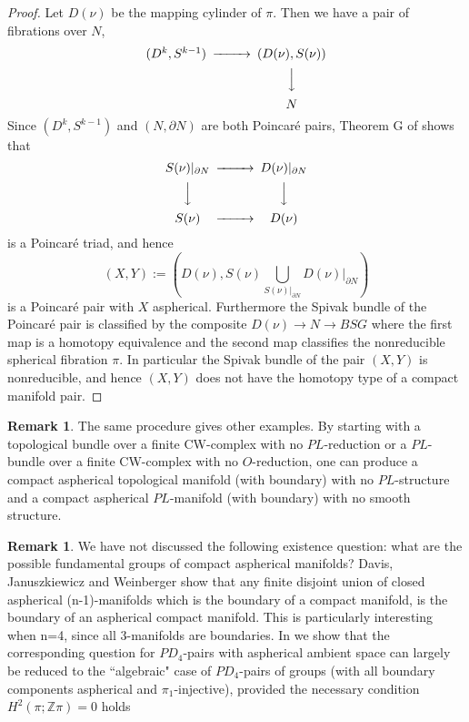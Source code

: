 \documentclass[12pt]{amsart}
\theoremstyle{definition}
\newtheorem{remark}[theorem]{Remark}
\newcommand{\Z}{\mathbb Z}
\begin{document}
\begin{proof}
Let $D(\nu)$ be the mapping cylinder of $\pi$.  Then we have a pair of fibrations over $N$,
$$
\begin{CD}
(D^k,S^{k-1}) @>>> (D(\nu),S(\nu))\\
@.  @VVV \\
@. N
\end{CD}
$$
Since $(D^k,S^{k-1})$ and $(N,\partial N)$ are both Poincar\'e pairs, Theorem G of \cite{KQS}
shows that
\begin{equation*}  
\begin{CD}
S(\nu)|_{\partial N} @>>> D(\nu)|_{\partial N}  \\
@VVV @VVV\\
S(\nu) @>>>  D(\nu)
\end{CD}
\end{equation*}
is a Poincar\'e triad, and hence
$$
(X,Y) := \left(D(\nu), S(\nu) \bigcup_{  S(\nu)|_{\partial N}}  D(\nu)|_{\partial N}\right)
$$
is a Poincar\'e pair with $X$ aspherical.  Furthermore the Spivak bundle of the Poincar\'e pair is classified by the composite $D(\nu) \to N \to BSG$ where the first map is a homotopy equivalence and the second map classifies the   nonreducible spherical fibration $\pi$.    In particular the Spivak bundle of the pair $(X,Y)$ is nonreducible, and hence $(X,Y)$ does not have the homotopy type of a compact manifold pair.  
\end{proof} 

\begin{remark}
The same procedure gives other examples.
By starting with a topological bundle over a finite CW-complex with no $PL$-reduction or a $PL$-bundle over a finite CW-complex with no $O$-reduction, one can produce a compact aspherical topological manifold (with boundary) with no $PL$-structure and a compact aspherical $PL$-manifold (with boundary) with no smooth structure.
\end{remark}


\begin{remark}
We have not discussed the following existence question: 
what are the possible fundamental groups of compact aspherical manifolds?
Davis, Januszkiewicz and Weinberger
\cite{DJW} show that any finite disjoint union 
of closed aspherical (n-1)-manifolds which is the boundary of a compact manifold, 
is the boundary of an aspherical compact manifold. 
This is particularly interesting when n=4, since all 3-manifolds are boundaries.
In \cite{dh3} we show that the corresponding question for $PD_4$-pairs with aspherical 
ambient space can largely be reduced to the ``algebraic" case of $PD_4$-pairs of groups
 (with all boundary components aspherical and $\pi_1$-injective), 
provided the necessary condition $H^2(\pi;\Z\pi)=0$ holds
\end{remark}
\end{document}
